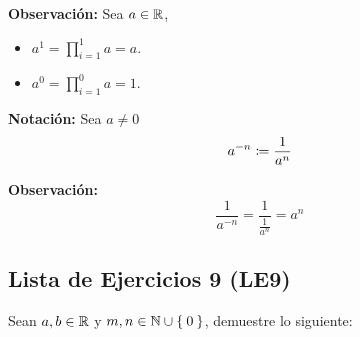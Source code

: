 \textbf{Observación:} Sea $a\in \mathbb{R}$,
\begin{itemize}
  \item $a^1= \prod_{i=1}^{1} a = a$.
  \item $a^0 = \prod_{i=1}^{0} a = 1$.%
\end{itemize}

\textbf{Notación:} Sea $a\neq 0$ \[a^{-n}\coloneqq \frac{1}{a^n}\]

\textbf{Observación:} \[\frac{1}{a^{-n}} = \frac{1}{\frac{1}{a^n}} = a^n\]

\subsection*{Lista de Ejercicios 9 (LE9)}

Sean $a,b\in \mathbb{R}$ y $m, n\in \mathbb{N}\cup\Set{0}$, demuestre lo siguiente:

